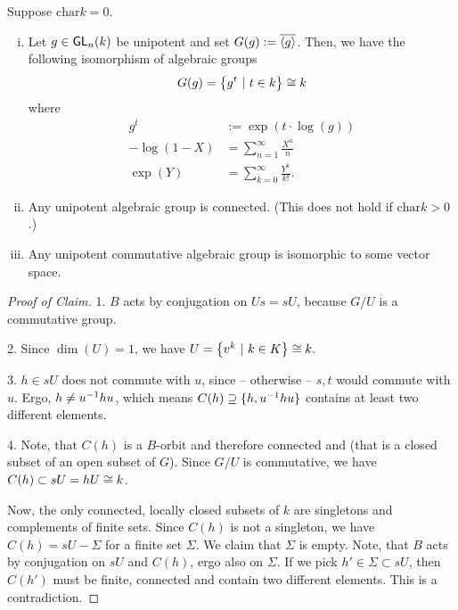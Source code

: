 \begin{lemma}
	Suppose $\mathrm{char} k = 0$.
	\begin{enumerate}[(i)]
		\item Let $g \in \textsf{GL}_n(k)$ be unipotent and set $G(g) := \overline{\left<g\right>}$. Then, we have the following isomorphism of algebraic groups
		\[ G(g) = \left\lbrace g^t ~ | ~ t \in k\right\rbrace \overset{}{\cong} k \]
		where
		\begin{align*}
		g^t &:= \exp( t \cdot \log(g))\\
		-\log(1 - X) &= \sum_{n = 1}^\infty \frac{X^n}{n}\\
		\exp(Y) &= \sum_{k = 0}^\infty \frac{Y^k}{k!}.
		\end{align*}
		
		\item Any unipotent algebraic group is connected. (This does not hold if $\mathrm{char} k > 0$.)
		\item Any unipotent commutative algebraic group is isomorphic to some vector space.
	\end{enumerate}
\end{lemma}

\newpage
\begin{proof}[Proof of Claim]
1.	$B$ acts by conjugation on $Us = sU$, because $G/U$ is a commutative group.
	
2. 	Since $\dim(U) = 1$, we have $U = \left\lbrace v^k ~ | ~ k \in K\right\rbrace \overset{}{\cong} k.$

3. $h \in sU$ does not commute with $u$, since -- otherwise -- $s,t$ would commute with $u$. Ergo, $h \neq u^{-1} h u$, which means $C(h) \supseteq \{h, u^{-1} h u\}$ contains at least two different elements.

4. Note, that $C(h)$ is a $B$-orbit and therefore connected and  (that is a closed subset of an open subset of $G$). Since $G/U$ is commutative, we have
$C(h) \subset sU = hU \overset{}{\cong} k$.

Now, the only connected, locally closed subsets of $k$ are singletons and complements of finite sets.
Since $C(h)$ is not a singleton, we have $C(h) = sU  - \Sigma$
for a finite set $\Sigma$.
We claim that $\Sigma$ is empty. Note, that $B$ acts by conjugation on $sU$ and $C(h)$, ergo also on $\Sigma$. If we pick $h' \in \Sigma \subset sU$, then $C(h')$ must be finite, connected and contain two different elements. This is a contradiction.	
\end{proof}


